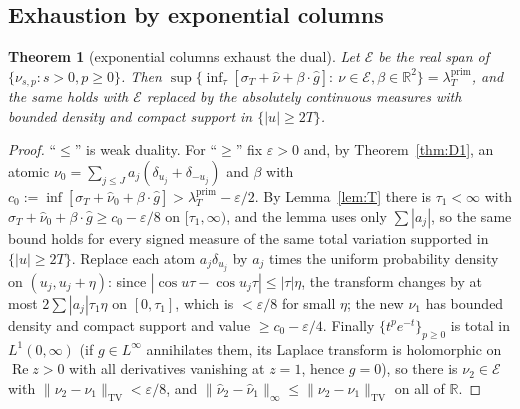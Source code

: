 \documentclass[11pt]{amsart}
\newtheorem{theorem}{Theorem}[section]
\theoremstyle{definition}
\theoremstyle{remark}
\newcommand{\R}{\mathbb R}
\newcommand{\Rel}{\operatorname{Re}}
\newcommand{\TV}{\operatorname{TV}}
\newcommand{\lamP}{\lambda^{\mathrm{prim}}_T}
\newcommand{\sT}{\sigma_T}
\newcommand{\nuh}{\widehat\nu}
\begin{document}
\subsection{Exhaustion by exponential columns}

\begin{theorem}[exponential columns exhaust the dual]\label{thm:E}
Let $\mathcal E$ be the real span of $\{\nu_{s,p}:s>0,p\ge0\}$. Then
$\sup\{\inf_\tau[\sT+\nuh+\beta\cdot\widehat g]:\ \nu\in\mathcal E,\beta\in\R^2\}=\lamP$, and the same
holds with $\mathcal E$ replaced by the absolutely continuous measures with bounded density and
compact support in $\{|u|\ge2T\}$.
\end{theorem}
\begin{proof}
``$\le$'' is weak duality. For ``$\ge$'' fix $\varepsilon>0$ and, by Theorem~\ref{thm:D1}, an atomic
$\nu_0=\sum_{j\le J}a_j(\delta_{u_j}+\delta_{-u_j})$ and $\beta$ with
$c_0:=\inf[\sT+\nuh_0+\beta\cdot\widehat g]>\lamP-\varepsilon/2$. By Lemma~\ref{lem:T} there is
$\tau_1<\infty$ with $\sT+\nuh_0+\beta\cdot\widehat g\ge c_0-\varepsilon/8$ on $[\tau_1,\infty)$,
and the lemma uses only $\sum|a_j|$, so the same bound holds for every signed measure of the
same total variation supported in $\{|u|\ge2T\}$. Replace each atom $a_j\delta_{u_j}$ by
$a_j$ times the uniform probability density on $(u_j,u_j+\eta)$: since
$|\cos u\tau-\cos u_j\tau|\le|\tau|\eta$, the transform changes by at most $2\sum|a_j|\tau_1\eta$
on $[0,\tau_1]$, which is $<\varepsilon/8$ for small $\eta$; the new $\nu_1$ has bounded density
and compact support and value $\ge c_0-\varepsilon/4$. Finally $\{t^pe^{-t}\}_{p\ge0}$ is total in
$L^1(0,\infty)$ (if $g\in L^\infty$ annihilates them, its Laplace transform is holomorphic on
$\Rel z>0$ with all derivatives vanishing at $z=1$, hence $g=0$), so there is $\nu_2\in\mathcal E$
with $\|\nu_2-\nu_1\|_{\TV}<\varepsilon/8$, and $\|\nuh_2-\nuh_1\|_\infty\le\|\nu_2-\nu_1\|_{\TV}$ on all of $\R$.
\end{proof}
\end{document}
